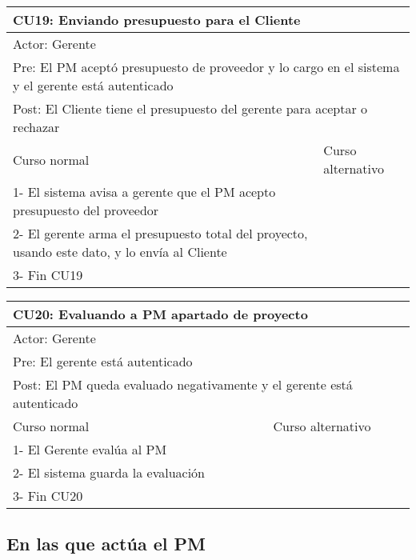 \begin{table}[H]
  \begin{adjustbox}{max width = \textwidth}
  \begin{tabular}{|l|l|}
    \hline
    \multicolumn{2}{|l|}{CU19: Enviando presupuesto para el Cliente} \\\hline
    \multicolumn{2}{|l|}{Actor: Gerente} \\\hline
    \multicolumn{2}{|l|}{Pre: El PM aceptó presupuesto de proveedor y lo cargo en el sistema y el gerente está autenticado} \\\hline
    \multicolumn{2}{|l|}{Post: El Cliente tiene el presupuesto del gerente para aceptar o rechazar} \\\hline
     Curso normal & Curso alternativo\\ \hline
	 1- El sistema avisa a gerente que el PM acepto presupuesto del proveedor & \\ \hline
	 2- El gerente arma el presupuesto total del proyecto, usando este dato, y lo envía al Cliente & \\ \hline
   3- Fin CU19 & \\ \hline
 \end{tabular}
  \end{adjustbox}
\end{table}

\begin{table}[H]
  \begin{adjustbox}{max width = \textwidth}
  \begin{tabular}{|l|l|}
    \hline
    \multicolumn{2}{|l|}{CU20: Evaluando a PM apartado de proyecto} \\\hline
    \multicolumn{2}{|l|}{Actor: Gerente} \\\hline
    \multicolumn{2}{|l|}{Pre: El gerente está autenticado} \\\hline
    \multicolumn{2}{|l|}{Post: El PM queda evaluado negativamente y el gerente está autenticado} \\\hline
     Curso normal & Curso alternativo\\ \hline
  	 1- El Gerente evalúa al PM & \\ \hline
  	 2- El sistema guarda la evaluación &\\ \hline
     3- Fin CU20 & \\ \hline
 \end{tabular}
  \end{adjustbox}
\end{table}

\subsection{En las que actúa el PM}

